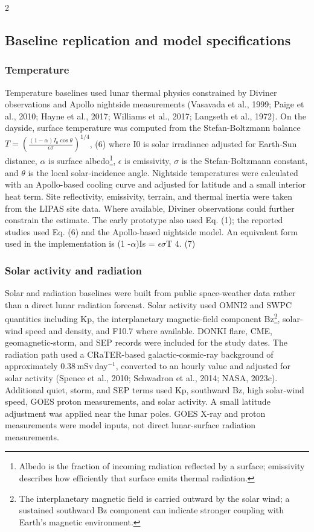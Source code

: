 \begin{multicols*}{2}
\subsection{Baseline replication and model specifications}

\subsubsection{Temperature}

Temperature baselines used lunar thermal physics constrained by Diviner observations and Apollo nightside measurements (Vasavada et al., 1999; Paige et al., 2010; Hayne et al., 2017; Williams et al., 2017; Langseth et al., 1972). On the dayside, surface temperature was computed from the Stefan-Boltzmann balance $T = \left(\frac{(1-\alpha) I_0 \cos\theta}{\epsilon\sigma}\right)^{1/4}$, (6) where I0 is solar irradiance adjusted for Earth-Sun distance, $\alpha$ is surface albedo\footnote{Albedo is the fraction of incoming radiation reflected by a surface; emissivity describes how efficiently that surface emits thermal radiation.}, $\epsilon$ is emissivity, $\sigma$ is the Stefan-Boltzmann constant, and $\theta$ is the local solar-incidence angle. Nightside temperatures were calculated with an Apollo-based cooling curve and adjusted for latitude and a small interior heat term. Site reflectivity, emissivity, terrain, and thermal inertia were taken from the LIPAS site data. Where available, Diviner observations could further constrain the estimate. The early prototype also used Eq. (1); the reported studies used Eq. (6) and the Apollo-based nightside model. An equivalent form used in the implementation is (1 -$\alpha$)Is = $\epsilon$$\sigma$T 4. (7)

\subsubsection{Solar activity and radiation}

Solar and radiation baselines were built from public space-weather data rather than a direct lunar radiation forecast. Solar activity used OMNI2 and SWPC quantities including Kp, the interplanetary magnetic-field component Bz\footnote{The interplanetary magnetic field is carried outward by the solar wind; a sustained southward Bz component can indicate stronger coupling with Earth's magnetic environment.}, solar-wind speed and density, and F10.7 where available. DONKI flare, CME, geomagnetic-storm, and SEP records were included for the study dates. The radiation path used a CRaTER-based galactic-cosmic-ray background of approximately 0.38\,mSv\,day$^{-1}$, converted to an hourly value and adjusted for solar activity (Spence et al., 2010; Schwadron et al., 2014; NASA, 2023c). Additional quiet, storm, and SEP terms used Kp, southward Bz, high solar-wind speed, GOES proton measurements, and solar activity. A small latitude adjustment was applied near the lunar poles. GOES X-ray and proton measurements were model inputs, not direct lunar-surface radiation measurements.


\end{multicols*}
